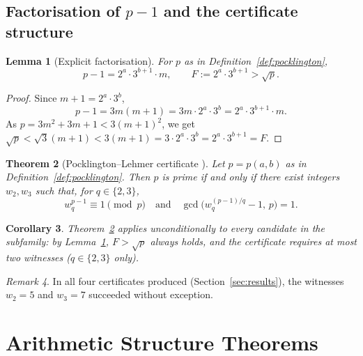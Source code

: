 \documentclass[11pt,a4paper]{article}
\newtheorem{theorem}{Theorem}[section]
\newtheorem{lemma}[theorem]{Lemma}
\newtheorem{corollary}[theorem]{Corollary}
\theoremstyle{definition}
\theoremstyle{remark}
\newtheorem{remark}[theorem]{Remark}
\begin{document}
\subsection{Factorisation of $p-1$ and the certificate structure}

\begin{rigorousbox}
\begin{lemma}[Explicit factorisation]\label{lem:factorisation}
For $p$ as in Definition~\ref{def:pocklington},
\[
  p - 1 = 2^a\cdot 3^{b+1}\cdot m, \qquad F := 2^a\cdot 3^{b+1} > \sqrt{p}.
\]
\end{lemma}
\end{rigorousbox}

\begin{proof}
Since $m+1=2^a\cdot 3^b$,
\[
  p-1 = 3m(m+1) = 3m\cdot 2^a\cdot 3^b = 2^a\cdot 3^{b+1}\cdot m.
\]
As $p = 3m^2+3m+1 < 3(m+1)^2$, we get $\sqrt{p}<\sqrt{3}(m+1)<3(m+1)=
3\cdot 2^a\cdot 3^b = 2^a\cdot 3^{b+1} = F$.
\end{proof}

\begin{rigorousbox}
\begin{theorem}[Pocklington--Lehmer certificate
\cite{Pocklington1914,LehmerPSW1975}]\label{thm:Pocklington}
Let $p = p(a,b)$ as in Definition~\ref{def:pocklington}. Then $p$ is prime
if and only if there exist integers $w_2,w_3$ such that, for $q\in\{2,3\}$,
\[
  w_q^{p-1}\equiv 1\pmod{p}\quad\text{and}\quad
  \gcd\!\bigl(w_q^{(p-1)/q}-1,\,p\bigr)=1.
\]
\end{theorem}
\end{rigorousbox}

\begin{corollary}\label{cor:pocklington}
Theorem~\ref{thm:Pocklington} applies unconditionally to every candidate
in the subfamily: by Lemma~\ref{lem:factorisation}, $F>\sqrt{p}$ always
holds, and the certificate requires at most two witnesses
($q\in\{2,3\}$ only).
\end{corollary}

\begin{remark}
In all four certificates produced (Section~\ref{sec:results}),
the witnesses $w_2 = 5$ and $w_3 = 7$ succeeded without exception.
\end{remark}

\section{Arithmetic Structure Theorems}\label{sec:filters}
\end{document}
